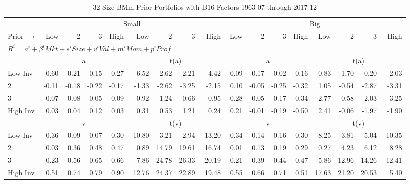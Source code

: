 
\begin{table}[!ht]
\footnotesize
\centering
\caption{32-Size-BMm-Prior Portfolios with B16 Factors 1963-07 through 2017-12}
\begin{tabular}{lrrrrrrrrrrrrrrrr}
  \toprule
    & \multicolumn{8}{c}{Small} & \multicolumn{8}{c}{Big} \\
      \cmidrule(r){2-9} \cmidrule(r){10-17}
    Prior $\rightarrow$ & Low & 2 & 3 & High & Low & 2 & 3 & High & Low & 2 & 3 & High & Low & 2 & 3 & High \\ 
  \midrule
  \multicolumn{17}{l}{$R^i=a^i+\beta^iMkt+s^iSize+v^iVal+m^iMom+p^iProf$} \\

  
    
      & \multicolumn{4}{c}{a} & \multicolumn{4}{c}{t(a)}
    
      & \multicolumn{4}{c}{a} & \multicolumn{4}{c}{t(a)}
    
    \\
      \cmidrule(r){2-5} \cmidrule(r){6-9} \cmidrule(r){10-13} \cmidrule(r){14-17}

    Low Inv   & -0.60  & -0.21  & -0.15  & 0.27  & -6.52  & -2.62  & -2.21  & 4.42  & 0.09  & -0.17  & 0.02  & 0.16  & 0.83  & -1.70  & 0.20  & 2.03  \\
           2  & -0.11  & -0.18  & -0.22  & -0.17  & -1.33  & -2.62  & -3.25  & -2.15  & 0.10  & -0.05  & -0.25  & -0.32  & 1.05  & -0.54  & -2.87  & -3.31  \\
           3  & 0.07  & -0.08  & 0.05  & 0.09  & 0.92  & -1.24  & 0.66  & 0.95  & 0.28  & -0.05  & -0.17  & -0.34  & 2.77  & -0.58  & -2.03  & -3.25  \\
    High Inv  & 0.03  & 0.04  & 0.12  & 0.03  & 0.31  & 0.53  & 1.21  & 0.24  & 0.21  & -0.01  & -0.19  & -0.50  & 2.41  & -0.06  & -1.97  & -1.90  \\

  
    
      & \multicolumn{4}{c}{v} & \multicolumn{4}{c}{t(v)}
    
      & \multicolumn{4}{c}{v} & \multicolumn{4}{c}{t(v)}
    
    \\
      \cmidrule(r){2-5} \cmidrule(r){6-9} \cmidrule(r){10-13} \cmidrule(r){14-17}

    Low Inv   & -0.36  & -0.09  & -0.07  & -0.30  & -10.80  & -3.21  & -2.94  & -13.20  & -0.34  & -0.14  & -0.16  & -0.30  & -8.25  & -3.81  & -5.04  & -10.35  \\
           2  & 0.03  & 0.36  & 0.48  & 0.47  & 0.89  & 14.79  & 19.61  & 16.74  & 0.01  & 0.13  & 0.19  & 0.29  & 0.27  & 4.23  & 6.12  & 8.28  \\
           3  & 0.23  & 0.56  & 0.65  & 0.66  & 7.86  & 24.78  & 26.33  & 20.19  & 0.21  & 0.39  & 0.44  & 0.47  & 5.86  & 12.96  & 14.26  & 12.41  \\
    High Inv  & 0.51  & 0.74  & 0.79  & 0.90  & 12.76  & 24.37  & 22.89  & 19.48  & 0.55  & 0.66  & 0.71  & 0.51  & 17.63  & 21.20  & 20.53  & 5.40  \\


\end{tabular}
\end{table}
